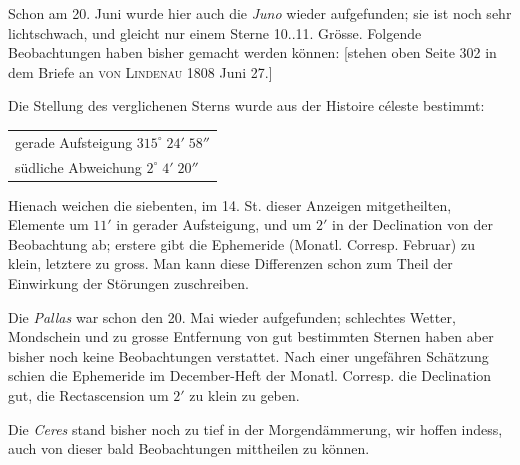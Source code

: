 \par\indent Schon am 20. Juni wurde hier auch die \emph{Juno} wieder aufgefunden; sie ist noch
sehr lichtschwach, und gleicht nur einem Sterne 10..11. Grösse. Folgende
Beobachtungen haben bisher gemacht werden können: [stehen oben Seite 302 in dem
Briefe an \textsc{von Lindenau} 1808 Juni 27.]

\par\indent Die Stellung des verglichenen Sterns wurde aus der Histoire céleste bestimmt:


\begin{center}\fontsize{10}{12}\selectfont\setlength{\tabcolsep}{3pt}\renewcommand{\arraystretch}{1.15}\begin{tabular}{l}
gerade Aufsteigung $315^\circ\;24'\;58''$\\
südliche Abweichung $2^\circ\;4'\;20''$
\end{tabular}\end{center}


\par\indent Hienach weichen die siebenten, im 14. St. dieser Anzeigen mitgetheilten, Elemente
um $11'$ in gerader Aufsteigung, und um $2'$ in der Declination von der Beobachtung ab;
erstere gibt die Ephemeride (Monatl. Corresp. Februar) zu klein, letztere zu gross.
Man kann diese Differenzen schon zum Theil der Einwirkung der Störungen zuschreiben.

\par\indent Die \emph{Pallas} war schon den 20. Mai wieder aufgefunden; schlechtes Wetter,
Mondschein und zu grosse Entfernung von gut bestimmten Sternen haben aber bisher
noch keine Beobachtungen verstattet. Nach einer ungefähren Schätzung schien die
Ephemeride im December-Heft der Monatl. Corresp. die Declination gut, die
Rectascension um $2'$ zu klein zu geben.

\par\indent Die \emph{Ceres} stand bisher noch zu tief in der Morgendämmerung, wir hoffen
indess, auch von dieser bald Beobachtungen mittheilen zu können.
